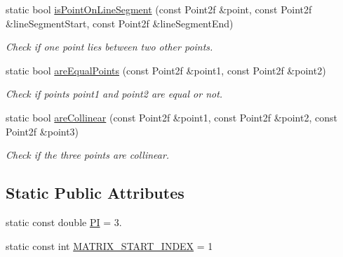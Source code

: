 \begin{DoxyCompactItemize}
static bool \hyperlink{classmultiscale_1_1Geometry2D_a608548e8588d9efbcfec90d2bd92ea55}{is\-Point\-On\-Line\-Segment} (const Point2f \&point, const Point2f \&line\-Segment\-Start, const Point2f \&line\-Segment\-End)
\begin{DoxyCompactList}\small\item\em Check if one point lies between two other points. \end{DoxyCompactList}\item 
static bool \hyperlink{classmultiscale_1_1Geometry2D_aa2d3ac595072b9ab61879a44629d7969}{are\-Equal\-Points} (const Point2f \&point1, const Point2f \&point2)
\begin{DoxyCompactList}\small\item\em Check if points point1 and point2 are equal or not. \end{DoxyCompactList}\item 
static bool \hyperlink{classmultiscale_1_1Geometry2D_aa8b75808a35a471becae0ad99e708bdd}{are\-Collinear} (const Point2f \&point1, const Point2f \&point2, const Point2f \&point3)
\begin{DoxyCompactList}\small\item\em Check if the three points are collinear. \end{DoxyCompactList}\end{DoxyCompactItemize}
\subsection*{Static Public Attributes}
\begin{DoxyCompactItemize}
\item 
static const double \hyperlink{classmultiscale_1_1Geometry2D_a7039b8bbe89283e22744c0631d597660}{P\-I} = 3.
\item 
static const int \hyperlink{classmultiscale_1_1Geometry2D_ade1d55d3ef110b73d42a3e4c4360ba17}{M\-A\-T\-R\-I\-X\-\_\-\-S\-T\-A\-R\-T\-\_\-\-I\-N\-D\-E\-X} = 1
\end{DoxyCompactItemize}
